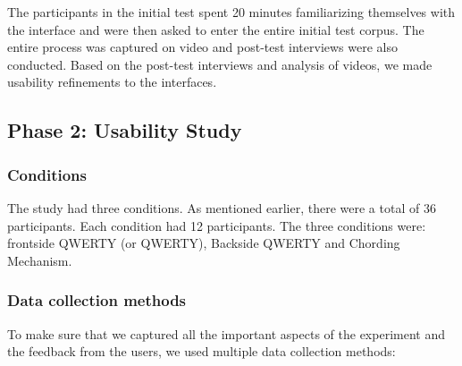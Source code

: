 The participants in the initial test spent 20 minutes familiarizing
themselves with the interface and were then asked to enter the entire
initial test corpus. The entire process was captured on video and
post-test interviews were also conducted. Based on the post-test
interviews and analysis of videos, we made usability refinements to
the interfaces.

\subsection{Phase 2: Usability Study}
\subsubsection{Conditions}

The study had three conditions. As mentioned earlier, there were
a total of 36 participants. Each condition had 12 participants. The
three conditions were: frontside QWERTY (or QWERTY), Backside QWERTY
and Chording Mechanism.

\subsubsection{Data collection methods}

To make sure that we captured all the important aspects of the
experiment and the feedback from the users, we used multiple data
collection methods:

